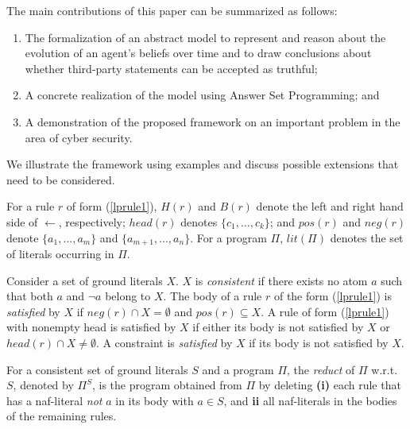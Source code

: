 \documentclass{article}
\begin{document}
The main contributions of this paper can be summarized as follows:
\begin{enumerate}
\item The formalization of an abstract model to 
represent and reason about the evolution of an agent's beliefs over time and to draw conclusions about whether third-party statements can be accepted as truthful;   
\item A concrete realization of the model using
Answer Set Programming; and
\item A demonstration of the proposed framework on an important problem in the
        area of  cyber security. 
\end{enumerate}
 We illustrate the framework 
 using examples and discuss possible extensions that need to be considered. 
 


 \iffalse 



For a rule $r$ of form (\ref{lprule1}), $H(r)$ and 
$B(r)$ denote the left and right hand side 
of $\leftarrow$, respectively; 
$head(r)$ denotes $\{c_1, \ldots,  c_k\}$; and 
$pos(r)$ and $neg(r)$ denote $\{a_1,\ldots,a_m\}$ and 
$\{a_{m+1},\ldots, a_n\}$.  
For a program $\Pi$, $lit(\Pi)$ denotes the set of literals occurring in $\Pi$. 

Consider a set of ground literals $X$. 
$X$ is \emph{consistent} if there exists no atom $a$ such that 
both $a$ and $\neg a$ belong to $X$. The
body of a rule $r$ of the form (\ref{lprule1}) is
{\em satisfied} by $X$ if $neg(r) \cap X = \emptyset$
and $pos(r) \subseteq X$. A rule of form
(\ref{lprule1}) with nonempty head 
is satisfied by $X$ if either its body is not
satisfied by $X$ or $head(r) \cap X \ne \emptyset$. 
A constraint is {\em satisfied} by $X$ 
if its body is not satisfied by $X$. 

For a consistent set of ground literals $S$ and a 
program $\Pi$, the {\em reduct} 
of $\Pi$ w.r.t. $S$, denoted by $\Pi^S$, is the program
obtained from  $\Pi$ by deleting
{\bf (i)} each rule that has a naf-literal {\em not} $a$ in its body with
$a \in S$, and
{\bf {ii}} all naf-literals in the bodies of the remaining rules.
\end{document}
